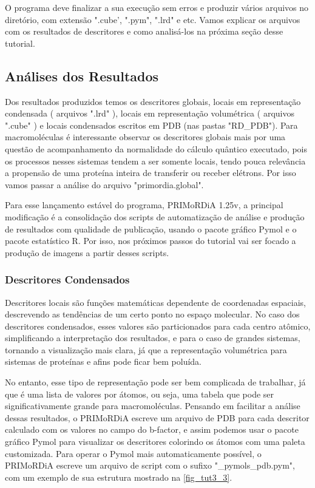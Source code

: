 \documentclass[a4paper,11pt]{refart}
\begin{document}
O programa deve finalizar a sua execução sem erros e produzir vários arquivos no diretório, com extensão ".cube', ".pym", ".lrd" e etc. Vamos explicar os arquivos com os resultados de descritores e como analisá-los na próxima seção desse tutorial.

\subsection{Análises dos Resultados}

Dos resultados produzidos temos os descritores globais, locais em representação condensada ( arquivos ".lrd" ), locais em representação volumétrica ( arquivos ".cube" ) e locais condensados escritos em PDB (nas pastas "RD\_PDB"). Para macromoléculas é interessante observar os descritores globais mais por uma questão de acompanhamento da normalidade do cálculo quântico executado, pois os processos nesses sistemas tendem a ser somente locais, tendo pouca relevância a propensão de uma proteína inteira de transferir ou receber elétrons. Por isso vamos passar a análise do arquivo "primordia.global".

Para esse lançamento estável do programa, PRIMoRDiA 1.25v, a principal modificação é a consolidação dos scripts de automatização de análise e produção de resultados com qualidade de publicação, usando o pacote gráfico Pymol e o pacote estatístico R. Por isso, nos próximos passos do tutorial vai ser focado a produção de imagens a partir desses scripts.

\subsubsection{Descritores Condensados} 

Descritores locais são funções matemáticas dependente de coordenadas espaciais, descrevendo as tendências de um certo ponto no espaço molecular. No caso dos descritores condensados, esses valores são particionados para cada centro atômico, simplificando a interpretação dos resultados, e para o caso de grandes sistemas, tornando a visualização mais clara, já que a representação volumétrica para sistemas de proteínas e afins pode ficar bem poluída.

No entanto, esse tipo de representação pode ser bem complicada de trabalhar, já que é uma lista de valores por átomos, ou seja, uma tabela que pode ser significativamente grande para macromoléculas. Pensando em facilitar a análise dessas resultados, o PRIMoRDiA escreve um arquivo de PDB para cada descritor calculado com os valores no campo do b-factor, e assim podemos usar o pacote gráfico Pymol para visualizar os descritores colorindo os átomos com uma paleta customizada. Para operar o Pymol mais automaticamente possível, o PRIMoRDiA escreve um arquivo de script com o sufixo "\_pymols\_pdb.pym", com um exemplo de sua estrutura mostrado na \autoref{fig_tut3_3}.
\end{document}
